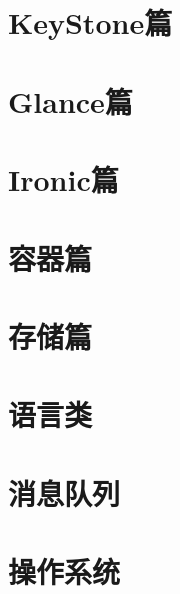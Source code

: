 \documentclass[openany,twoside]{book}
\begin{document}
\begin{titlepage}
	\\
	\vspace{\fill}
	\\
	\vspace{80mm}
\end{titlepage}

\newpage
\let\cleardoublepage\clearpage
\frontmatter
{
  \renewcommand*\contentsname{目录}
  \tableofcontents%
  \thispagestyle{empty}
}

\mainmatter

\part{KeyStone篇}



\part{Glance篇}

\part{Ironic篇}




\part{容器篇}


\part{存储篇}

\part{语言类}


\part{消息队列}

\part{操作系统}

\end{document}
